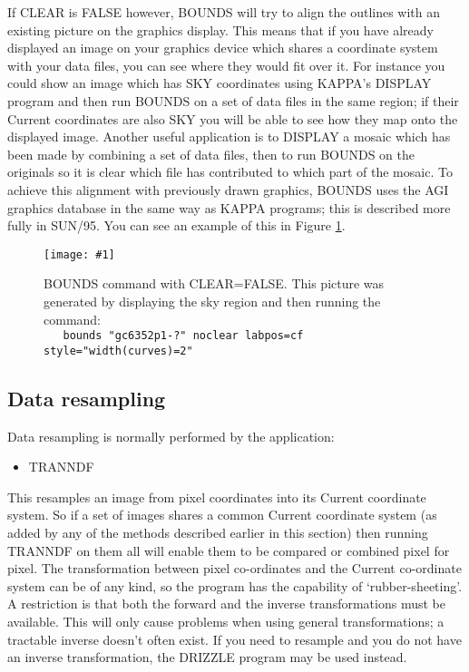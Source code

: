 \documentclass[twoside,11pt]{article}
\newcommand{\htmladdimg}[1]{}
\newcommand{\htmlref}[2]{#1}
\newcommand{\xref}[3]{#1}
\newcommand{\xlabel}[1]{}
\renewcommand{\_}{\texttt{\symbol{95}}}
\newcommand{\routine}[1]{{\sc #1}}
\newcommand{\xroutine}[1]{\htmlref{{\sc #1}}{#1}}
\newcommand{\myfig} [5] {
  \begin{figure}
    \centering\texttt{[image: \#1]}
    \typeout{#1 inserted on page \arabic{page}}
    \caption{\label{#4}#5}
  \end{figure}
  }
\newcommand{\myfig}[5]{
    \htmladdimg{#3}\\
    Figure: \label{#4} #5
    }
\begin{document}
If CLEAR is FALSE however, \routine{BOUNDS} will try to align the
outlines with an existing picture on the graphics display.
This means that if you have already displayed an image
on your graphics device which shares a coordinate system with
your data files, you can see where they would fit over it.
For instance you could show an image which has SKY coordinates
using KAPPA's \xref{DISPLAY}{sun95}{DISPLAY} program 
and then run \routine{BOUNDS} on a set of data files in the
same region; if their Current coordinates are also SKY 
you will be able to see how they map onto the displayed image.
Another useful application is to \routine{DISPLAY} 
a mosaic which has been made by combining a set of data files, 
then to run \routine{BOUNDS} on the originals 
so it is clear which file has contributed to which part of the mosaic.
To achieve this alignment with previously drawn graphics, 
\routine{BOUNDS} uses the AGI graphics database in 
the same way as KAPPA programs; 
this is described more fully in \xref{SUN/95}{sun95}{se_agitate}.
You can see an example of this in Figure \ref{OUTSKY}.

\myfig{sun139outsky.eps}{height=0.5\textheight}{outsky.gif}{OUTSKY}{BOUNDS
command with CLEAR=FALSE.  This picture was generated by displaying
the sky region and then running the command:\protect\\
{\tt\ \ \ bounds "gc6352p1-?" noclear labpos=cf style="width(curves)=2"}}





\subsection{\xlabel{resampling}\label{resampling}Data resampling}

Data resampling is normally performed by the application:
\begin{itemize}
\item \xroutine{TRANNDF}
\end{itemize}
This resamples an image from pixel coordinates into
its Current coordinate system.
So if a set of images shares a common Current coordinate system
(as added by any of the methods described earlier in this section)
then running \routine{TRANNDF} on them all will enable them to
be compared or combined pixel for pixel.
The transformation between pixel co-ordinates and the Current
co-ordinate system can be of any kind,
so the program has the capability of `rubber-sheeting'.
A restriction is that both the forward and the inverse transformations
must be available. This will only cause problems when using general
transformations; a tractable inverse doesn't often exist.
If you need to resample and you do not have an inverse transformation, 
the \xroutine{DRIZZLE} program
may be used instead.
\end{document}
